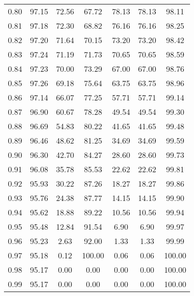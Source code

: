 \begin{tabular}{|c|c|c|c|c|c|c|}
      0.80 &     97.15 &     72.56 &      67.72 &   78.13 &      78.13 &         98.11 \\
      0.81 &     97.18 &     72.30 &      68.82 &   76.16 &      76.16 &         98.25 \\
      0.82 &     97.20 &     71.64 &      70.15 &   73.20 &      73.20 &         98.42 \\
      0.83 &     97.24 &     71.19 &      71.73 &   70.65 &      70.65 &         98.59 \\
      0.84 &     97.23 &     70.00 &      73.29 &   67.00 &      67.00 &         98.76 \\
      0.85 &     97.26 &     69.18 &      75.64 &   63.75 &      63.75 &         98.96 \\
      0.86 &     97.14 &     66.07 &      77.25 &   57.71 &      57.71 &         99.14 \\
      0.87 &     96.90 &     60.67 &      78.28 &   49.54 &      49.54 &         99.30 \\
      0.88 &     96.69 &     54.83 &      80.22 &   41.65 &      41.65 &         99.48 \\
      0.89 &     96.46 &     48.62 &      81.25 &   34.69 &      34.69 &         99.59 \\
      0.90 &     96.30 &     42.70 &      84.27 &   28.60 &      28.60 &         99.73 \\
      0.91 &     96.08 &     35.78 &      85.53 &   22.62 &      22.62 &         99.81 \\
      0.92 &     95.93 &     30.22 &      87.26 &   18.27 &      18.27 &         99.86 \\
      0.93 &     95.76 &     24.38 &      87.77 &   14.15 &      14.15 &         99.90 \\
      0.94 &     95.62 &     18.88 &      89.22 &   10.56 &      10.56 &         99.94 \\
      0.95 &     95.48 &     12.84 &      91.54 &    6.90 &       6.90 &         99.97 \\
      0.96 &     95.23 &      2.63 &      92.00 &    1.33 &       1.33 &         99.99 \\
      0.97 &     95.18 &      0.12 &     100.00 &    0.06 &       0.06 &        100.00 \\
      0.98 &     95.17 &      0.00 &       0.00 &    0.00 &       0.00 &        100.00 \\
      0.99 &     95.17 &      0.00 &       0.00 &    0.00 &       0.00 &        100.00 \\
\bottomrule
\end{tabular}

